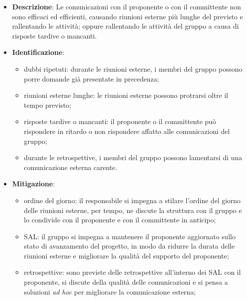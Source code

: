 \label{risk:comunicazione esterna carente}
\begin{itemize}
	\item \textbf{Descrizione}:
	      Le comunicazioni con il proponente o con il committente non sono
	      efficaci ed efficienti, causando riunioni esterne più lunghe del
	      previsto e rallentando le attività; oppure rallentando le attività
	      del gruppo a causa di risposte tardive o mancanti.

	\item \textbf{Identificazione}:
	      \begin{itemize}
		      \item dubbi ripetuti: durante le riunioni esterne, i membri del
		            gruppo possono porre domande già presentate in precedenza;

		      \item riunioni esterne lunghe: le riunioni esterne possono
		            protrarsi oltre il tempo previsto;

		      \item risposte tardive o mancanti: il proponente o il committente
		            può rispondere in ritardo o non rispondere affatto alle
		            comunicazioni del gruppo;

		      \item durante le retrospettive, i membri del gruppo possono
		            lamentarsi di una comunicazione esterna carente.
	      \end{itemize}

	\item \textbf{Mitigazione}:
	      \begin{itemize}
		      \item ordine del giorno: il responsabile si impegna a stilare
		            l'ordine del giorno delle riunioni esterne, per tempo, ne
		            discute la struttura con il gruppo e lo condivide con il
		            proponente e con il committente in anticipo;

		      \item SAL: il gruppo si impegna a mantenere il
		            proponente aggiornato sullo stato di avanzamento del progetto,
		            in modo da ridurre la durata delle riunioni esterne e
		            migliorare la qualità del supporto del proponente;

		      \item retrospettive: sono previste delle retrospettive
		            all'interno dei SAL con il proponente, si discute della
		            qualità delle comunicazioni e si pensa a soluzioni
		            \textit{ad hoc} per migliorare la comunicazione esterna;


\end{itemize}
\end{itemize}
